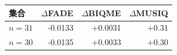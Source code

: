\begin{tabular*}{\columnwidth}{@{\extracolsep{\fill}}lrrr@{}}\toprule
集合 & $\Delta$FADE & $\Delta$BIQME & $\Delta$MUSIQ \\\midrule
$n=31$ & -0.0133 & +0.0031 & +0.31 \\
$n=30$ & -0.0135 & +0.0033 & +0.30 \\
\bottomrule\end{tabular*}

